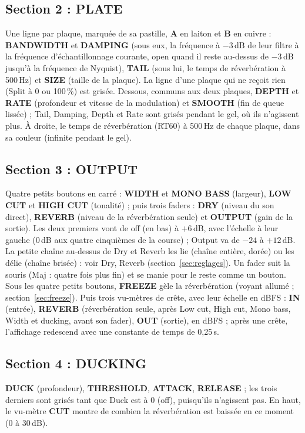 \documentclass[a4paper,11pt]{article}
\newcommand{\ctl}[1]{\textsf{\textbf{#1}}}   %
\newcommand{\dB}{\,dB}
\begin{document}
\subsection{Section 2 : PLATE}
Une ligne par plaque, marquée de sa pastille, \ctl{A} en laiton et \ctl{B} en cuivre :
\ctl{BANDWIDTH} et \ctl{DAMPING} (sous eux, la fréquence à $-3$\dB{} de leur filtre à la
fréquence d'échantillonnage courante, \og open\fg{} quand il reste au-dessus de $-3$\dB{}
jusqu'à la fréquence de Nyquist), \ctl{TAIL} (sous lui, le temps de réverbération à 500\,Hz)
et \ctl{SIZE} (taille de la plaque). La ligne d'une plaque qui ne reçoit rien (Split à 0 ou
100\,\%) est grisée. Dessous, communs aux deux plaques, \ctl{DEPTH} et \ctl{RATE} (profondeur et
vitesse de la modulation) et \ctl{SMOOTH} (fin de queue lissée) ; Tail, Damping, Depth et Rate sont grisés pendant le gel, où ils
n'agissent plus. À droite, le temps de réverbération (RT60) à 500\,Hz de chaque plaque, dans sa
couleur (\og infinite\fg{} pendant le gel).

\subsection{Section 3 : OUTPUT}
Quatre petits boutons en carré : \ctl{WIDTH} et \ctl{MONO BASS} (largeur), \ctl{LOW CUT} et
\ctl{HIGH CUT} (tonalité) ; puis trois faders : \ctl{DRY} (niveau du son direct),
\ctl{REVERB} (niveau de la réverbération seule) et \ctl{OUTPUT} (gain de la sortie). Les deux
premiers vont de \og off\fg{} (en bas) à $+6$\dB, avec l'échelle à leur gauche (0\dB{} aux
quatre cinquièmes de la course) ; Output va de $-24$ à $+12$\dB. La petite chaîne au-dessus de
Dry et Reverb les lie (chaîne entière, dorée) ou les délie (chaîne brisée) : voir Dry, Reverb
(section~\ref{sec:reglages}). Un fader suit la souris
(\textsf{Maj} : quatre fois plus fin) et se manie pour le reste comme un bouton. Sous les
quatre petits boutons, \ctl{FREEZE} gèle la réverbération (voyant allumé ;
section~\ref{sec:freeze}). Puis trois vu-mètres de crête, avec leur échelle en dBFS : \ctl{IN} (entrée), \ctl{REVERB} (réverbération seule, après Low cut, High cut,
Mono bass, Width et ducking, avant son fader), \ctl{OUT} (sortie), en dBFS ; après une crête, l'affichage redescend avec une constante de temps de 0,25\,s.

\subsection{Section 4 : DUCKING}
\ctl{DUCK} (profondeur), \ctl{THRESHOLD}, \ctl{ATTACK}, \ctl{RELEASE} ; les trois derniers
sont grisés tant que Duck est à 0 (\og off\fg), puisqu'ils n'agissent pas. En haut, le
vu-mètre \ctl{CUT} montre de combien la réverbération est baissée en ce moment (0 à 30\dB).
\end{document}
